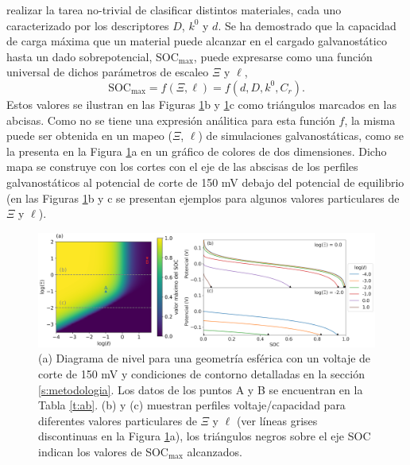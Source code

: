 realizar la tarea no-trivial de clasificar distintos materiales, cada uno 
caracterizado por los descriptores $D$, $k^0$ y $d$. Se ha demostrado \cite{gavilan2022} que la capacidad de carga máxima que un material puede alcanzar en el cargado galvanostático hasta un dado sobrepotencial, SOC$_{\max}$, 
puede expresarse como una función universal de dichos parámetros de escaleo $\Xi$ y $\ell$,
\begin{equation}\label{eq:socmax}
    \text{SOC}_{\max} = f(\Xi, \ell) = f(d, D, k^0, C_r).
\end{equation}
Estos valores se ilustran en las Figuras \ref{fig:diagnostico}b y \ref{fig:diagnostico}c como triángulos marcados en las abcisas.
Como no se tiene una expresión análitica para esta función $f$, la misma puede ser 
obtenida en un mapeo ($\Xi$, $\ell$) de simulaciones galvanostáticas, como se la 
presenta en la Figura \ref{fig:diagnostico}a en un gráfico de colores de dos 
dimensiones. Dicho mapa se construye con los cortes con el eje de las abscisas de los perfiles galvanostáticos
al potencial de corte de 150 mV debajo del potencial de equilibrio (en las Figuras 
\ref{fig:diagnostico}b y c se presentan ejemplos para algunos valores particulares 
de $\Xi$ y $\ell$).
\begin{figure}[h!]
    \centering
    \includegraphics[width=\textwidth]{FastCharging/un/introduccion/diagnosis-merged.png}
    \caption{(a) Diagrama de nivel para una geometría esférica con un voltaje de 
    corte de 150 mV y condiciones de contorno detalladas en la sección 
    \ref{s:metodologia}. Los datos de los puntos A y B se encuentran en la 
    Tabla \ref{t:ab}. (b) y (c) muestran perfiles voltaje/capacidad para 
    diferentes valores particulares de $\Xi$ y $\ell$ (ver líneas grises 
    discontinuas en la Figura \ref{fig:diagnostico}a), los triángulos negros 
    sobre el eje SOC indican los valores de SOC$_{\max}$ alcanzados.}
    \label{fig:diagnostico}
\end{figure}

